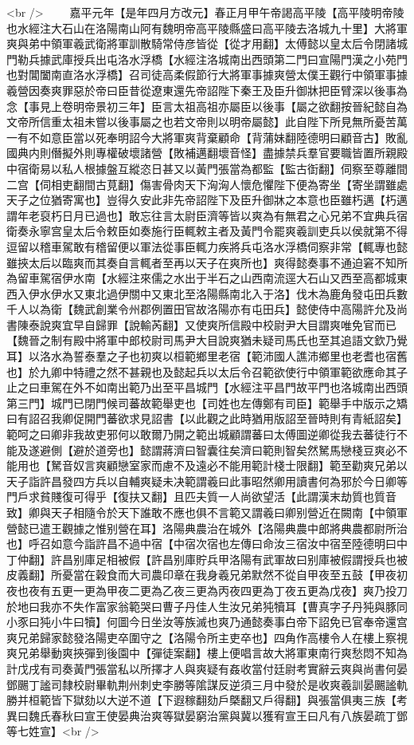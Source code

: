 <br />
　　嘉平元年【是年四月方改元】春正月甲午帝謁高平陵【高平陵明帝陵也水經注大石山在洛陽南山阿有魏明帝高平陵縣盛曰高平陵去洛城九十里】大將軍爽與弟中領軍羲武衛將軍訓散騎常侍彦皆從【從才用翻】太傅懿以皇太后令閉諸城門勒兵據武庫授兵出屯洛水浮橋【水經注洛城南出西頭第二門曰宣陽門漢之小苑門也對閶闔南直洛水浮橋】召司徒高柔假節行大將軍事據爽營太僕王觀行中領軍事據羲營因奏爽罪惡於帝曰臣昔從遼東還先帝詔陛下秦王及臣升御牀把臣臂深以後事為念【事見上卷明帝景初三年】臣言太祖高祖亦屬臣以後事【屬之欲翻按晉紀懿自為文帝所信重太祖未嘗以後事屬之也若文帝則以明帝屬懿】此自陛下所見無所憂苦萬一有不如意臣當以死奉明詔今大將軍爽背棄顧命【背蒲妹翻陸德明曰顧音古】敗亂國典内則僭擬外則專權破壞諸營【敗補邁翻壞音怪】盡據禁兵羣官要職皆置所親殿中宿衛易以私人根據盤互縱恣日甚又以黃門張當為都監【監古衘翻】伺察至尊離間二宫【伺相吏翻間古莧翻】傷害骨肉天下洶洶人懷危懼陛下便為寄坐【寄坐謂雖處天子之位猶寄寓也】豈得久安此非先帝詔陛下及臣升御牀之本意也臣雖朽邁【朽邁謂年老裒朽日月已過也】敢忘往言太尉臣濟等皆以爽為有無君之心兄弟不宜典兵宿衛奏永寧宫皇太后令敕臣如奏施行臣輒敕主者及黃門令罷爽羲訓吏兵以侯就第不得逗留以稽車駕敢有稽留便以軍法從事臣輒力疾將兵屯洛水浮橋伺察非常【輒專也懿雖挾太后以臨爽而其奏自言輒者至再以天子在爽所也】爽得懿奏事不通迫窘不知所為留車駕宿伊水南【水經注來儒之水出于半石之山西南流逕大石山又西至高都城東西入伊水伊水又東北過伊關中又東北至洛陽縣南北入于洛】伐木為鹿角發屯田兵數千人以為衛【魏武創業令州郡例置田官故洛陽亦有屯田兵】懿使侍中高陽許允及尚書陳泰說爽宜早自歸罪【說輸芮翻】又使爽所信殿中校尉尹大目謂爽唯免官而已【魏晉之制有殿中將軍中郎校尉司馬尹大目說爽猶未疑司馬氏也至其追語文欽乃覺耳】以洛水為誓泰羣之子也初爽以桓範鄉里老宿【範沛國人譙沛鄉里也老耆也宿舊也】於九卿中特禮之然不甚親也及懿起兵以太后令召範欲使行中領軍範欲應命其子止之曰車駕在外不如南出範乃出至平昌城門【水經注平昌門故平門也洛城南出西頭第三門】城門已閉門候司蕃故範舉吏也【司姓也左傳鄭有司臣】範舉手中版示之矯曰有詔召我卿促開門蕃欲求見詔書【以此觀之此時猶用版詔至晉時則有青紙詔矣】範呵之曰卿非我故吏邪何以敢爾乃開之範出城顧謂蕃曰太傅圖逆卿從我去蕃徒行不能及遂避側【避於道旁也】懿謂蔣濟曰智囊往矣濟曰範則智矣然駑馬戀棧豆爽必不能用也【駑音奴言爽顧戀室家而慮不及遠必不能用範計棧士限翻】範至勸爽兄弟以天子詣許昌發四方兵以自輔爽疑未决範謂羲曰此事昭然卿用讀書何為邪於今日卿等門戶求貧賤復可得乎【復扶又翻】且匹夫質一人尚欲望活【此謂漢末劫質也質音致】卿與天子相隨令於天下誰敢不應也俱不言範又謂羲曰卿别營近在闕南【中領軍營懿已遣王觀據之惟别營在耳】洛陽典農治在城外【洛陽典農中郎將典農都尉所治也】呼召如意今詣許昌不過中宿【中宿次宿也左傳曰命汝三宿汝中宿至陸德明曰中丁仲翻】許昌别庫足相被假【許昌别庫貯兵甲洛陽有武軍故曰别庫被假謂授兵也被皮義翻】所憂當在穀食而大司農印章在我身羲兄弟默然不從自甲夜至五鼓【甲夜初夜也夜有五更一更為甲夜二更為乙夜三更為丙夜四更為丁夜五更為戊夜】爽乃投刀於地曰我亦不失作富家翁範哭曰曹子丹佳人生汝兄弟㹠犢耳【曹真字子丹㹠與豚同小豕曰㹠小牛曰犢】何圖今日坐汝等族滅也爽乃通懿奏事白帝下詔免已官奉帝還宫爽兄弟歸家懿發洛陽吏卒圍守之【洛陽令所主吏卒也】四角作高樓令人在樓上察視爽兄弟舉動爽挾彈到後園中【彈徒案翻】樓上便唱言故大將軍東南行爽愁悶不知為計戊戌有司奏黃門張當私以所擇才人與爽疑有姦收當付廷尉考實辭云爽與尚書何晏鄧颺丁謐司隸校尉畢軌荆州刺史李勝等隂謀反逆須三月中發於是收爽羲訓晏颺謐軌勝并桓範皆下獄劾以大逆不道【下遐稼翻劾戶槩翻又戶得翻】與張當俱夷三族【考異曰魏氏春秋曰宣王使晏典治爽等獄晏窮治黨與冀以獲宥宣王曰凡有八族晏疏丁鄧等七姓宣】<br />
